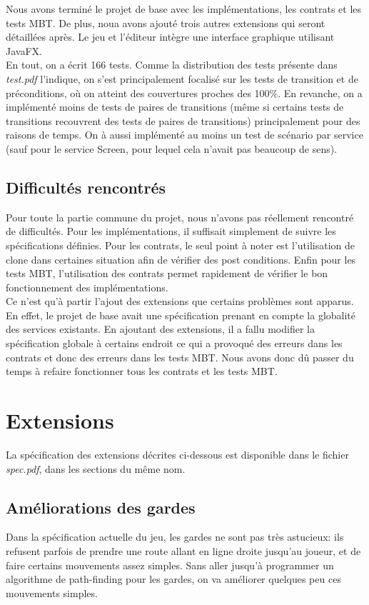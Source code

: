 \documentclass{article}
\begin{document}
Nous avons terminé le projet de base avec les implémentations, les contrats et les tests MBT. De plus, noua avons ajouté trois autres extensions qui seront détaillées après. Le jeu et l'éditeur intègre une interface graphique utilisant JavaFX.\\
En tout, on a écrit 166 tests. Comme la distribution des tests présente dans \textit{test.pdf} l'indique, on s'est principalement focalisé sur les tests de transition et de préconditions, où on atteint des couvertures proches des 100\%. En revanche, on a implémenté moins de tests de paires de transitions (même si certains tests de transitions recouvrent des tests de paires de transitions) principalement pour des raisons de temps. On à aussi implémenté au moins un test de scénario par service (sauf pour le service \textrm{Screen}, pour lequel cela n'avait pas beaucoup de sens).

\subsection{Difficultés rencontrés}

Pour toute la partie commune du projet, nous n'avons pas réellement rencontré de difficultés. Pour les implémentations, il suffisait simplement de suivre les spécifications définies. Pour les contrats, le seul point à noter est l'utilisation de clone dans certaines situation  afin de vérifier des post conditions. Enfin pour les tests MBT, l'utilisation des contrats permet rapidement de vérifier le bon fonctionnement des implémentations.\\

Ce n'est qu'à partir l'ajout des extensions que certains problèmes sont apparus. En effet, le projet de base avait une spécification prenant en compte la globalité des services existants. En ajoutant des extensions, il a fallu modifier la spécification globale à certains endroit ce qui a provoqué des erreurs dans les contrats et donc des erreurs dans les tests MBT. Nous avons donc dû passer du temps à refaire fonctionner tous les contrats et les tests MBT.

\section{Extensions}
La spécification des extensions décrites ci-dessous est disponible dans le fichier \textit{spec.pdf}, dans les sections du même nom.

\subsection{Améliorations des gardes}
Dans la spécification actuelle du jeu, les gardes ne sont pas très astucieux: ils refusent parfois de prendre une route allant en ligne droite jusqu'au joueur, et de faire certains mouvements assez simples. Sans aller jusqu'à programmer un algorithme de path-finding pour les gardes, on va améliorer quelques peu ces mouvements simples.
\end{document}
